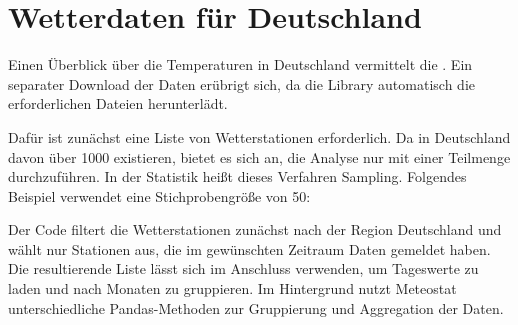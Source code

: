 \section{Wetterdaten für Deutschland}

Einen Überblick über die Temperaturen in Deutschland vermittelt die . Ein separater Download der Daten erübrigt sich, da die Library automatisch die erforderlichen Dateien herunterlädt.

Dafür ist zunächst eine Liste von Wetterstationen erforderlich. Da in Deutschland davon über 1000 existieren, bietet es sich an, die Analyse nur mit einer Teilmenge durchzuführen. In der Statistik heißt dieses Verfahren Sampling. Folgendes Beispiel verwendet eine Stichprobengröße von 50:

\medskip



\PYTHON{}




\PYTHON{}






\medskip


Der Code filtert die Wetterstationen zunächst nach der Region Deutschland und wählt nur Stationen aus, die im gewünschten Zeitraum Daten gemeldet haben. Die resultierende Liste lässt sich im Anschluss verwenden, um Tageswerte zu laden und nach Monaten zu gruppieren. Im Hintergrund nutzt Meteostat unterschiedliche Pandas-Methoden zur Gruppierung und Aggregation der Daten.

\medskip



\PYTHON{}

